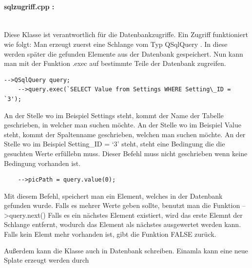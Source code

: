 \documentclass[11pt,a4paper]{article} %
\begin{document}
\paragraph{sqlzugriff.cpp :} $\;$ \\
	Diese Klasse ist verantwortlich für die Datenbankzugriffe.
	Ein Zugriff funktioniert wie folgt:
	Man erzeugt zuerst eine Schlange vom Typ QSqlQuery . In diese werden später die gefunden Elemente aus der Datenbank gespeichert. Nun kann man mit der Funktion .exec auf bestimmte Teile der Datenbank zugreifen.
	\begin{frame}

\begin{lstlisting}
-->QSqlQuery query;
	-->query.exec(`SELECT Value from Settings WHERE Setting\_ID = `3');
	\end{lstlisting}
\end{frame}
	An der Stelle wo im Beispiel Settings steht, kommt der Name der Tabelle geschrieben, in welcher man suchen möchte.
	An der Stelle wo im Beispiel Value steht, kommt der Spaltenname geschrieben, welchen man suchen möchte.
	An der Stelle wo im Beispiel Setting\_ID = `3' steht, steht eine Bedingung die die gesuchten Werte erfüllebn muss. Dieser Befehl muss nicht geschrieben wenn keine Bedingung vorhanden ist.
	
	\begin{frame}

\begin{lstlisting}
	-->picPath = query.value(0);
	\end{lstlisting}
\end{frame}
	Mit diesem Befehl, speichert man ein Element, welches in der Datenbank gefunden wurde. Falls es mehrer Werte geben sollte, benutzt man die Funktion -->query.next()
	Falls es ein nächstes Element existiert, wird das erste Elemnt der Schlange entfernt, wodurch das Element als nächstes ausgewertet werden kann. Falls kein Elemt mehr vorhanden ist, gibt die Funktion FALSE zurück.
\par	
	Außerdem kann die Klasse auch in Datenbank schreiben. Einamla kann eine neue Splate erzeugt werden durch
	
\end{document}
